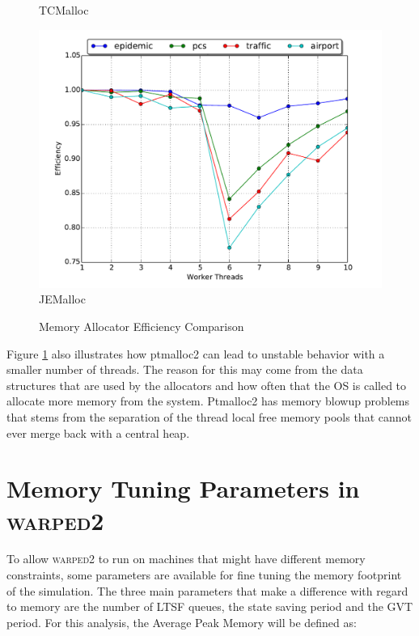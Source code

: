 \documentclass[11pt]{book}
\begin{document}
\begin{figure}
\begin{minipage}{.5\textwidth}
\begin{center}
      TCMalloc \\
    \end{center}
  \end{minipage}
  \centering
  \begin{minipage}{.5\textwidth}
    \begin{center}
      \includegraphics[width=\textwidth,keepaspectratio,quiet]{figs/memory_allocation/jemalloc_efficiency.pdf} \\
      JEMalloc \\
    \end{center}
  \end{minipage}
  \caption{Memory Allocator Efficiency Comparison}\label{allocator_analysis_efficiency}
\end{figure}

Figure \ref{allocator_analysis_efficiency} also illustrates how ptmalloc2 can lead to unstable
behavior with a smaller number of threads.  The reason for this may come from the data structures
that are used by the allocators and how often that the OS is called to allocate more memory
from the system.  Ptmalloc2 has memory blowup problems that stems from the separation of the thread
local free memory pools that cannot ever merge back with a central heap.

\section{Memory Tuning Parameters in \textsc{warped2}}

To allow \textsc{warped2} to run on machines that might have different memory constraints,
some parameters are available for fine tuning the memory footprint of the simulation.  The
three main parameters that make a difference with regard to memory are the number of LTSF queues,
the state saving period and the GVT period.  For this analysis, the Average Peak Memory will be
defined as:
\end{document}
